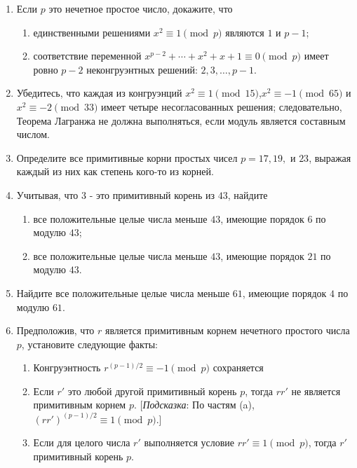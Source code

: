 \documentclass[11pt]{article}
\begin{document}
\begin{enumerate}
    \item Если $p$ это нечетное простое число, докажите, что
    \begin{enumerate}
        \item единственными решениями $x^2 \equiv 1 \pmod{p}$ являются $1$ и $p-1$;
        \item соответствие переменной $x^{p-2} + \cdots + x^2 + x + 1 \equiv 0 \pmod{p}$ имеет ровно $p-2$ неконгруэнтных решений: $2, 3, \ldots , p-1.$
    \end{enumerate}
    
\newpage
{}

    \item Убедитесь, что каждая из конгруэнций $x^2 \equiv 1 \pmod{15}$,$ x^2 \equiv -1 \pmod{65}$ и $x^2 \equiv -2 \pmod{33}$ имеет четыре несогласованных решения; следовательно, Теорема Лагранжа не должна выполняться, если модуль является составным числом.
    \item Определите все примитивные корни простых чисел $p = 17, 19,$ и $23$, выражая каждый из них как степень кого-то из корней.
    \item Учитывая, что $3$ - это примитивный корень из $43$, найдите
    \begin{enumerate}
        \item все положительные целые числа меньше $43$, имеющие порядок $6$ по модулю $43$;
        \item все положительные целые числа меньше $43$, имеющие порядок $21$ по модулю $43$.
    \end{enumerate}
    \item Найдите все положительные целые числа меньше $61$, имеющие порядок $4$ по модулю $61$.
    \item Предположив, что $r$ является примитивным корнем нечетного простого числа $p$, установите следующие факты:
    \begin{enumerate}
        \item Конгруэнтность $r^{(p-1)/2}\equiv -1 \pmod{p}$ сохраняется
        \item Если $r'$ это любой другой примитивный корень $p$, тогда $rr'$ не является примитивным корнем $p$. [\emph{Подсказка}: По частям (a), $(rr')^{(p-1)/2} \equiv 1 \pmod{p}.$]
        \item Если для целого числа $r'$ выполняется условие $rr' \equiv 1 \pmod{p}$, тогда $r'$ примитивный корень $p$.

\end{enumerate}
\end{enumerate}
\end{document}
